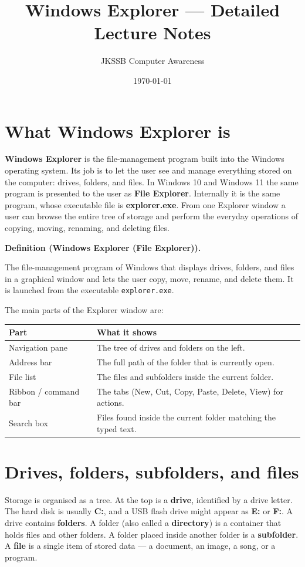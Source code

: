 \documentclass[11pt]{article}
\title{Windows Explorer --- Detailed Lecture Notes}
\author{JKSSB Computer Awareness}
\date{\today}
\newenvironment{definitionbox}[1]{%
  \par\noindent\textbf{Definition (#1).}\ \itshape
}{\par\vspace{0.3em}}
\begin{document}
\maketitle

\section{What Windows Explorer is}
\textbf{Windows Explorer} is the file-management program built into the
Windows operating system. Its job is to let the user see and manage
everything stored on the computer: drives, folders, and files. In Windows 10
and Windows 11 the same program is presented to the user as \textbf{File
Explorer}. Internally it is the same program, whose executable file is
\textbf{explorer.exe}. From one Explorer window a user can browse the entire
tree of storage and perform the everyday operations of copying, moving,
renaming, and deleting files.

\begin{definitionbox}{Windows Explorer (File Explorer)}
The file-management program of Windows that displays drives, folders, and
files in a graphical window and lets the user copy, move, rename, and delete
them. It is launched from the executable \texttt{explorer.exe}.
\end{definitionbox}

The main parts of the Explorer window are:
\begin{center}
\begin{tabular}{p{}p{}}
\toprule
\textbf{Part} & \textbf{What it shows} \\
\midrule
Navigation pane & The tree of drives and folders on the left. \\
Address bar & The full path of the folder that is currently open. \\
File list & The files and subfolders inside the current folder. \\
Ribbon / command bar & The tabs (New, Cut, Copy, Paste, Delete, View) for actions. \\
Search box & Files found inside the current folder matching the typed text. \\
\bottomrule
\end{tabular}
\end{center}

\section{Drives, folders, subfolders, and files}
Storage is organised as a tree. At the top is a \textbf{drive}, identified by
a drive letter. The hard disk is usually \textbf{C:}, and a USB flash drive
might appear as \textbf{E:} or \textbf{F:}. A drive contains
\textbf{folders}. A folder (also called a \textbf{directory}) is a container
that holds files and other folders. A folder placed inside another folder is
a \textbf{subfolder}. A \textbf{file} is a single item of stored data --- a
document, an image, a song, or a program.
\end{document}
